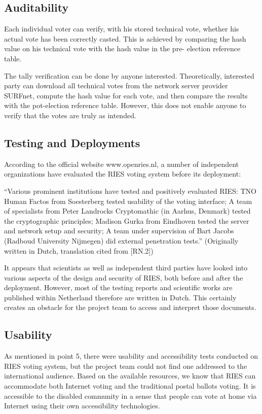 \subsection{Auditability}

Each individual voter can verify, with his stored technical vote, whether his actual vote has been correctly casted. This is achieved by comparing the hash value on his technical vote with the hash value in the pre- election reference table.

The tally verification can be done by anyone interested. Theoretically, interested party can download all technical votes from the network server provider SURFnet, compute the hash value for each vote, and then compare the results with the pot-election reference table. However, this does not enable anyone to verify that the votes are truly as intended.

\subsection{Testing and Deployments}

According to the official website \textcolor[rgb]{0.078431375,0.3254902,0.6901961}{www.openries.nl, }a number of independent organizations have evaluated the RIES voting system before its deployment:

``Various prominent institutions have tested and positively evaluated RIES: TNO Human Factos from Soesterberg tested usability of the voting interface; A team of specialists from Peter Landrocks Cryptomathic (in Aarhus, Denmark) tested the cryptographic principles; Madison Gurka from Eindhoven tested the server and network setup and security; A team under supervision of Bart Jacobs (Radboud University Nijmegen) did external penetration tests.'' (Originally written in Dutch, translation cited from [RN.2])

It appears that scientists as well as independent third parties have looked into various aspects of the design and security of RIES, both before and after the deployment. However, most of the testing reports and scientific works are published within Netherland therefore are written in Dutch. This certainly creates an obstacle for the project team to access and interpret those documents.

\subsection{Usability}

As mentioned in point 5, there were usability and accessibility tests conducted on RIES voting system, but the project team could not find one addressed to the international audience. Based on the available resources, we know that RIES can accommodate both Internet voting and the traditional postal ballots voting. It is accessible to the disabled community in a sense that people can vote at home via Internet using their own accessibility technologies.

